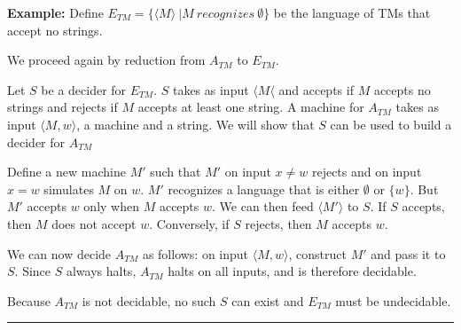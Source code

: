 \documentclass[twoside]{article}
\newenvironment{proof}{{\bf Proof:}}{\hfill\rule{2mm}{2mm}}
\begin{document}
\textbf{Example:}  Define $E_{TM} = \{ \langle M \rangle  \ | M \ recognizes \ \emptyset\}$ be the language of TMs that accept no strings.


\begin{proof}
	We proceed again by reduction from $A_{TM}$ to $E_{TM}$.
	
	Let $S$ be a decider for $E_{TM}$.  $S$ takes as input $\langle M \langle$ and accepts if $M$ accepts no strings and rejects if $M$ accepts at least one string.  A machine for $A_{TM}$ takes as input $\langle M,w\rangle$, a machine and a string.  We will show that $S$ can be used to build a decider for $A_{TM}$
	
	Define a new machine $M'$ such that $M'$ on input $x\neq w$ rejects and on input $x=w$ simulates $M$ on $w$.  $M'$ recognizes a language that is either $\emptyset$ or $\{w\}$.  But $M'$ accepts $w$ only when $M$ accepts $w$.  We can then feed $\langle M' \rangle$ to $S$.  If $S$ accepts, then $M$ does not accept $w$.  Conversely, if $S$ rejects, then $M$ accepts $w$.
	
	We can now decide $A_{TM}$ as follows: on input $\langle M,w\rangle$, construct $M'$ and pass it to $S$.  Since $S$ always halts, $A_{TM}$ halts on all inputs, and is therefore decidable.
	
	Because $A_{TM}$ is not decidable, no such $S$ can exist and $E_{TM}$ must be undecidable.
	
	
	
\end{proof}
\end{document}
